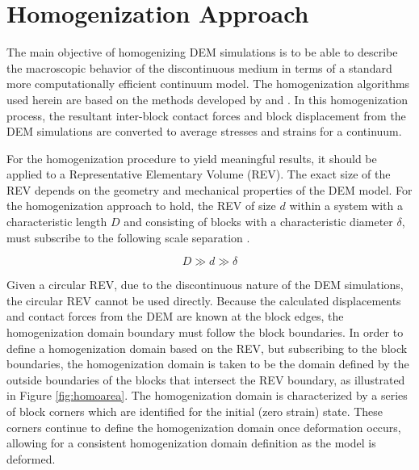 \section{Homogenization Approach}

The main objective of homogenizing DEM simulations is to be able to describe the macroscopic behavior of the discontinuous medium in terms of a standard more computationally efficient continuum model. The homogenization algorithms used herein are based on the methods developed by \citet{daddetta_particle_2004} and \citet{wellmann_homogenization_2008}. In this homogenization process, the resultant inter-block contact forces and block displacement from the DEM simulations are converted to average stresses and strains for a continuum.

For the homogenization procedure to yield meaningful results, it should be applied to a Representative Elementary Volume (REV). The exact size of the REV depends on the geometry and mechanical properties of the DEM model. For the homogenization approach to hold, the REV of size $d$ within a system with a characteristic length $D$ and consisting of blocks with a characteristic diameter $\delta$, must subscribe to the following scale separation \citep{wellmann_homogenization_2008}. 

\begin{equation}
D\gg d\gg\delta\label{eqn:hom1a}
\end{equation}

Given a circular REV, due to the discontinuous nature of the DEM simulations, the circular REV cannot be used directly. Because the calculated displacements and contact forces from the DEM are known at the block edges, the homogenization domain boundary must follow the block boundaries. In order to define a homogenization domain based on the REV, but subscribing to the block boundaries, the homogenization domain is taken to be the domain defined by the outside boundaries of the blocks that intersect the REV boundary, as illustrated in Figure \ref{fig:homoarea}. The homogenization domain is characterized by a series of block corners which are identified for the initial (zero strain) state. These corners continue to define the homogenization domain once deformation occurs, allowing for a consistent homogenization domain definition as the model is deformed. 

